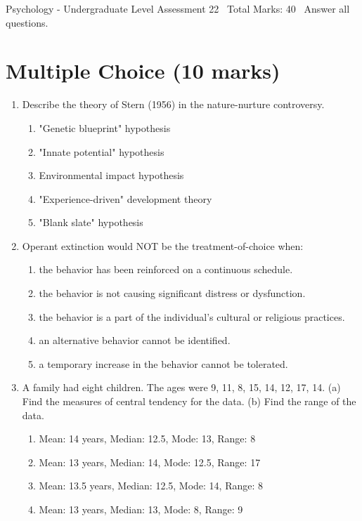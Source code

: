 \documentclass[12pt]{article}
\begin{document}
\begin{center}
Psychology - Undergraduate Level Assessment 22 \
Total Marks: 40 \
Answer all questions.
\end{center}

\section*{Multiple Choice (10 marks)}
\begin{enumerate}[label=\arabic*.]
\item Describe the theory of Stern (1956) in the nature-nurture controversy.
\begin{enumerate}[label=(\alph*)]
    \item "Genetic blueprint" hypothesis
    \item "Innate potential" hypothesis
    \item Environmental impact hypothesis
    \item "Experience-driven" development theory
    \item "Blank slate" hypothesis
\end{enumerate}
\item Operant extinction would NOT be the treatment-of-choice when:
\begin{enumerate}[label=(\alph*)]
    \item the behavior has been reinforced on a continuous schedule.
    \item the behavior is not causing significant distress or dysfunction.
    \item the behavior is a part of the individual's cultural or religious practices.
    \item an alternative behavior cannot be identified.
    \item a temporary increase in the behavior cannot be tolerated.
\end{enumerate}
\item A family had eight children. The ages were 9, 11, 8, 15, 14, 12, 17, 14. (a) Find the measures of central tendency for the data. (b) Find the range of the data.
\begin{enumerate}[label=(\alph*)]
    \item Mean: 14 years, Median: 12.5, Mode: 13, Range: 8
    \item Mean: 13 years, Median: 14, Mode: 12.5, Range: 17
    \item Mean: 13.5 years, Median: 12.5, Mode: 14, Range: 8
    \item Mean: 13 years, Median: 13, Mode: 8, Range: 9

\end{enumerate}
\end{enumerate}
\end{document}
